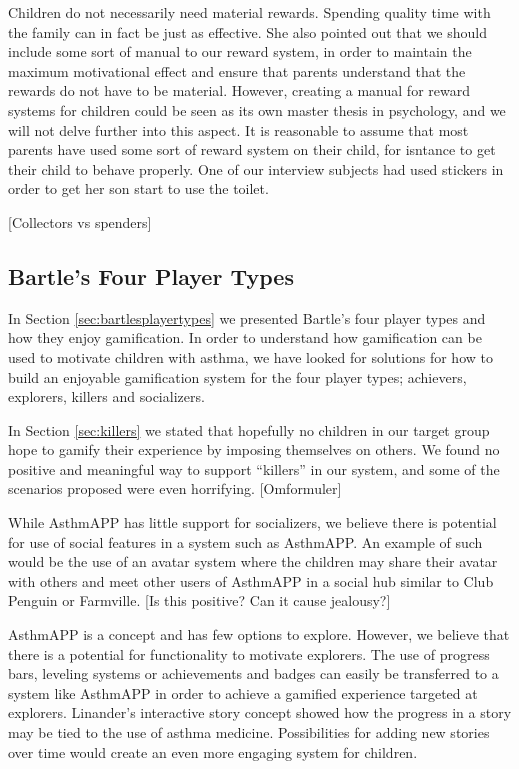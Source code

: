 Children do not necessarily need material rewards. Spending quality time with the family can in fact be just as effective. She also pointed out that we should include some sort of manual to our reward system, in order to maintain the maximum motivational effect and ensure that parents understand that the rewards do not have to be material. However, creating a manual for reward systems for children could be seen as its own master thesis in psychology, and we will not delve further into this aspect. It is reasonable to assume that most parents have used some sort of reward system on their child, for isntance to get their child to behave properly. One of our interview subjects had used stickers in order to get her son start to use the toilet. 

[Collectors vs spenders]

\subsection{Bartle's Four Player Types}
In Section \ref{sec:bartlesplayertypes} we presented Bartle's four player types and how they enjoy gamification. In order to understand how gamification can be used to motivate children with asthma, we have looked for solutions for how to build an enjoyable gamification system for the four player types; achievers, explorers, killers and socializers. 

In Section \ref{sec:killers} we stated that hopefully no children in our target group hope to gamify their experience by imposing themselves on others. We found no positive and meaningful way to support ``killers'' in our system, and some of the scenarios proposed were even horrifying. [Omformuler]

While AsthmAPP has little support for socializers, we believe there is potential for use of social features in a system such as AsthmAPP. An example of such would be the use of an avatar system where the children may share their avatar with others and meet other users of AsthmAPP in a social hub similar to Club Penguin or Farmville. 
[Is this positive? Can it cause jealousy?]\iref{}

AsthmAPP is a concept and has few options to explore. However, we believe that there is a potential for functionality to motivate explorers. The use of progress bars, leveling systems or achievements and badges can easily be transferred to a system like AsthmAPP in order to achieve a gamified experience targeted at explorers. Linander's interactive story concept showed how the progress in a story may be tied to the use of asthma medicine\cite{linander2013utvikling}. Possibilities for adding new stories over time would create an even more engaging system for children. 

